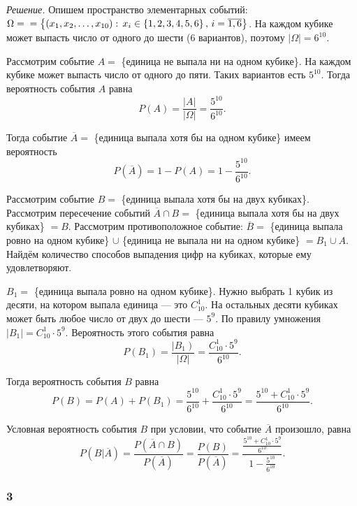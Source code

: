 \textit{Решение.}
Опишем пространство элементарных событий:
$ \Omega = \\
= \left\{ \left( x_1, x_2, \dotsc, x_{10} \right): \,
x_i \in \left\{1, 2, 3, 4, 5, 6 \right\}, \,
i =
\overline{1, 6} \right\} $.
На каждом кубике может выпасть число от одного до шести (6 вариантов), поэтому $ \left| \Omega \right| = 6^{10}$.

Рассмотрим событие $A =$ \{единица не выпала ни на одном кубике\}.
На каждом кубике может выпасть число от одного до пяти.
Таких вариантов есть $5^{10}$.
Тогда вероятность события $A$ равна
$$P \left( A \right) =
\frac{ \left| A \right| }{ \left| \Omega \right| } =
\frac{5^{10}}{6^{10}}.$$

Тогда событие $ \overline{A} =$ \{единица выпала хотя бы на одном кубике\} имеем вероятность
$$P \left( \overline{A} \right) =
1 - P \left( A \right) =
1 - \frac{5^{10}}{6^{10}}.$$

Рассмотрим событие $B =$ \{единица выпала хотя бы на двух кубиках\}.
Рассмотрим пересечение событий $ \overline{A} \cap B =$ \{единица выпала хотя бы на двух кубиках\} $= B$.
Рассмотрим противоположное событие: $ \overline{B} =$ \{единица выпала ровно на одном кубике\} $
\cup $ \{единица не выпала ни на одном кубике\} $= B_1 \cup A$.
Найдём количество способов выпадения цифр на кубиках, которые ему удовлетворяют.

$B_1 =$ \{единица выпала ровно на одном кубике\}.
Нужно выбрать 1 кубик из десяти, на котором выпала единица --- это $C_{10}^1$.
На остальных десяти кубиках может быть любое число от двух до шести --- $5^9$.
По правилу умножения $ \left| B_1 \right| = C_{10}^1 \cdot 5^9$.
Вероятность этого события равна
$$P \left( B_1 \right) =
\frac{ \left| B_1 \right) }{ \left| \Omega \right| } =
\frac{C_{10}^1 \cdot 5^9}{6^{10}}.$$

Тогда вероятность события $B$ равна
$$P \left( B \right) =
P \left( A \right) + P \left( B_1 \right) =
\frac{5^{10}}{6^{10}} + \frac{C_{10}^1 \cdot 5^9}{6^{10}} =
\frac{5^{10} + C_{10}^1 \cdot 5^9}{6^{10}}.$$

Условная вероятность события $B$ при условии, что событие $ \overline{A}$ произошло, равна
$$P \left( \left. B \right| \overline{A} \right) =
\frac{P \left( \overline{A} \cap B \right)}{P \left( \overline{A} \right) } =
\frac{P \left( B \right)}{P \left( \overline{A} \right) } =
\frac{ \frac{5^{10} + C_{10}^1 \cdot 5^9}{6^{10}}}{1 - \frac{5^{10}}{6^{10}} }.$$

\subsubsection*{3}

